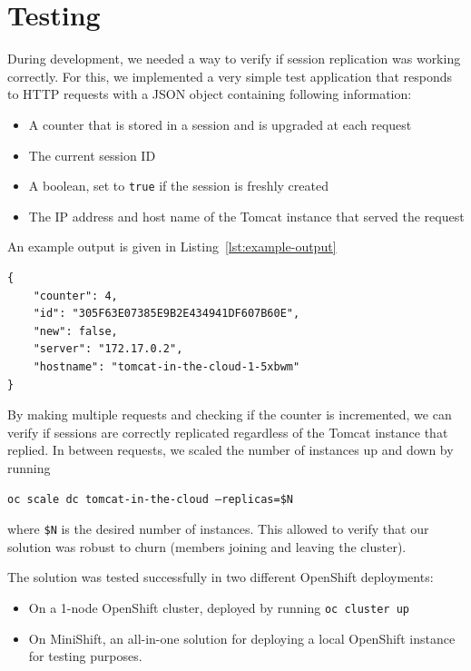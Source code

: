 \documentclass[11pt,a4paper]{article}
\begin{document}

\section{Testing}

During development, we needed a way to verify if session replication was working correctly. For this, we implemented a very simple test application that responds to HTTP requests with a JSON object containing following information:

\begin{itemize}
    \item A counter that is stored in a session and is upgraded at each request
    \item The current session ID
    \item A boolean, set to \texttt{true} if the session is freshly created
    \item The IP address and host name of the Tomcat instance that served the request
\end{itemize}

An example output is given in Listing~\ref{lst:example-output}

\begin{lstlisting}[caption=Example output,label=lst:example-output]
{
    "counter": 4,
    "id": "305F63E07385E9B2E434941DF607B60E",
    "new": false,
    "server": "172.17.0.2",
    "hostname": "tomcat-in-the-cloud-1-5xbwm"
}
\end{lstlisting}

By making multiple requests and checking if the counter is incremented, we can verify if sessions are correctly replicated regardless of the Tomcat instance that replied. In between requests, we scaled the number of instances up and down by running

\texttt{oc scale dc tomcat-in-the-cloud --replicas=\$N}

where \texttt{\$N} is the desired number of instances. This allowed to verify that our solution was robust to churn (members joining and leaving the cluster).

The solution was tested successfully in two different OpenShift deployments:
\begin{itemize}
    \item On a 1-node OpenShift cluster, deployed by running \texttt{oc cluster up}
    \item On MiniShift\autocite{minishift}, an all-in-one solution for deploying a local OpenShift instance for testing purposes.
\end{itemize}
\end{document}
